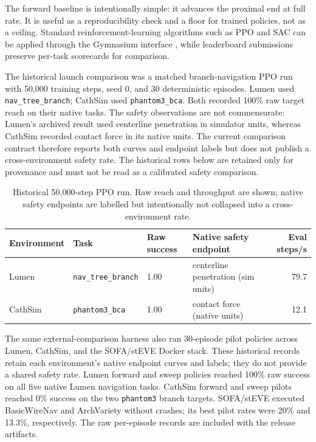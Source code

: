 \documentclass[11pt]{article}
\begin{document}
The forward baseline is intentionally simple: it advances the proximal end at full rate. It is useful as a reproducibility check and a floor for trained policies, not as a ceiling. Standard reinforcement-learning algorithms such as PPO and SAC can be applied through the Gymnasium interface \cite{schulman2017ppo,haarnoja2018sac,haarnoja2018applications}, while leaderboard submissions preserve per-task scorecards for comparison.

The historical launch comparison was a matched branch-navigation PPO run with 50,000 training steps, seed 0, and 30 deterministic episodes. Lumen used \texttt{nav\_tree\_branch}; CathSim used \texttt{phantom3\_bca}. Both recorded 100\% raw target reach on their native tasks. The safety observations are not commensurate: Lumen's archived result used centerline penetration in simulator units, whereas CathSim recorded contact force in its native units. The current comparison contract therefore reports both curves and endpoint labels but does not publish a cross-environment safety rate. The historical rows below are retained only for provenance and must not be read as a calibrated safety comparison.

\begin{table}[H]
  \centering
  \caption{Historical 50,000-step PPO run. Raw reach and throughput are shown; native safety endpoints are labelled but intentionally not collapsed into a cross-environment rate.}
  \label{tab:ppo_comparison}
  \small
  \begin{tabular}{llllr}
    \toprule
    Environment & Task & Raw success & Native safety endpoint & Eval steps/s \\
    \midrule
    Lumen & \texttt{nav\_tree\_branch} & 1.00 & centerline penetration (sim units) & 79.7 \\
    CathSim & \texttt{phantom3\_bca} & 1.00 & contact force (native units) & 12.1 \\
    \bottomrule
  \end{tabular}
\end{table}

The same external-comparison harness also ran 30-episode pilot policies across Lumen, CathSim, and the SOFA/stEVE Docker stack. These historical records retain each environment's native endpoint curves and labels; they do not provide a shared safety rate. Lumen forward and sweep policies reached 100\% raw success on all five native Lumen navigation tasks. CathSim forward and sweep pilots reached 0\% success on the two \texttt{phantom3} branch targets. SOFA/stEVE executed BasicWireNav and ArchVariety without crashes; its best pilot rates were 20\% and 13.3\%, respectively. The raw per-episode records are included with the release artifacts.
\end{document}
